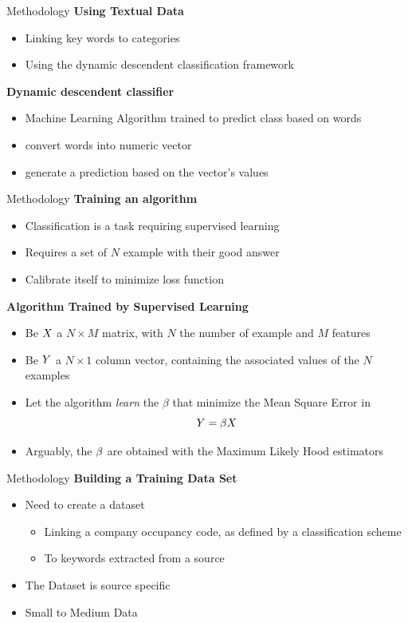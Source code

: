 \begin{frame}[label=metho]{Methodology}
	\textbf{Using Textual Data}
	\begin{itemize}
		\item Linking key words to categories 
		\item Using the dynamic descendent classification framework
	\end{itemize}	
	
	\textbf{Dynamic descendent classifier}
	\begin{itemize}
		\item Machine Learning Algorithm trained to predict class based on words
		\item convert words into numeric vector
		\item generate a prediction based on the vector's values
	\end{itemize}	
	
\end{frame}


\begin{frame}[label=metho]{Methodology}
	\textbf{Training an algorithm}
	\begin{itemize}
		\item Classification is a task requiring supervised learning
		\item Requires a set of $N$ example with their good answer
		\item Calibrate itself to minimize loss function
	\end{itemize}	
	
	\textbf{Algorithm Trained by Supervised Learning}
	\begin{itemize}
		\item Be $\boldmath{X}$ a $N\times M$ matrix, with $N$ the number of example and $M$ features
		\item Be $\boldmath{Y}$ a $N\times1$ column vector, containing the associated values of the $N$ examples
		\item Let the algorithm \textit{learn} the $\beta$ that minimize the Mean Square Error in 
		$$ \boldmath{Y} = \beta\boldmath{X} $$
		\item Arguably, the $\boldmath{\beta}$ are obtained with the Maximum Likely Hood estimators
	\end{itemize}	
	
\end{frame}


\begin{frame}[label=metho]{Methodology}
	\textbf{Building a Training Data Set}
	\begin{itemize}
		\item Need to create a dataset 
		\begin{itemize}
			\item Linking a company occupancy code, as defined by a classification scheme
			\item To keywords extracted from a source
		\end{itemize}	
		\item The Dataset is source specific
		\item Small to Medium Data
	
	\end{itemize}	
\end{frame}


